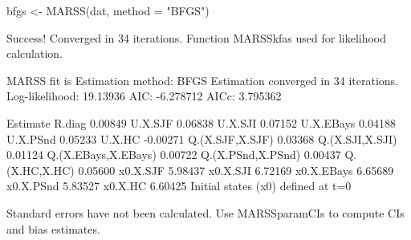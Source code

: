 \begin{Schunk}
\begin{Sinput}
 bfgs <- MARSS(dat, method = "BFGS")
\end{Sinput}
\begin{Soutput}
Success! Converged in 34 iterations.
Function MARSSkfas used for likelihood calculation.

MARSS fit is
Estimation method: BFGS 
Estimation converged in 34 iterations. 
Log-likelihood: 19.13936 
AIC: -6.278712   AICc: 3.795362   
 
                    Estimate
R.diag               0.00849
U.X.SJF              0.06838
U.X.SJI              0.07152
U.X.EBays            0.04188
U.X.PSnd             0.05233
U.X.HC              -0.00271
Q.(X.SJF,X.SJF)      0.03368
Q.(X.SJI,X.SJI)      0.01124
Q.(X.EBays,X.EBays)  0.00722
Q.(X.PSnd,X.PSnd)    0.00437
Q.(X.HC,X.HC)        0.05600
x0.X.SJF             5.98437
x0.X.SJI             6.72169
x0.X.EBays           6.65689
x0.X.PSnd            5.83527
x0.X.HC              6.60425
Initial states (x0) defined at t=0

Standard errors have not been calculated. 
Use MARSSparamCIs to compute CIs and bias estimates.
\end{Soutput}
\end{Schunk}
